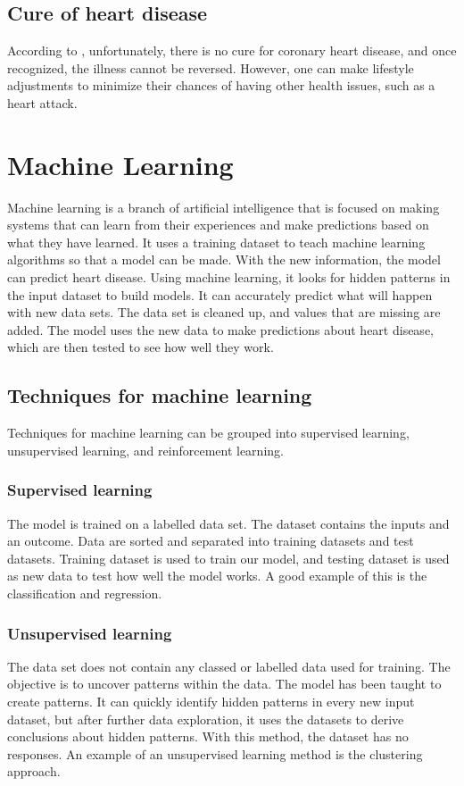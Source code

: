 \subsection{Cure of heart disease}
According to , unfortunately, there is no cure for coronary heart disease, and once recognized, the illness cannot be reversed. However, one can make lifestyle adjustments to minimize their chances of having other health issues, such as a heart attack.

\section{Machine Learning}
Machine learning is a branch of artificial intelligence that is focused on making systems that can learn from their experiences and make predictions based on what they have learned. It uses a training dataset to teach machine learning algorithms so that a model can be made. With the new information, the model can predict heart disease. Using machine learning, it looks for hidden patterns in the input dataset to build models. It can accurately predict what will happen with new data sets. The data set is cleaned up, and values that are missing are added. The model uses the new data to make predictions about heart disease, which are then tested to see how well they work. 

\subsection{Techniques for machine learning}
Techniques for machine learning can be grouped into supervised learning, unsupervised learning, and reinforcement learning.

\subsubsection{Supervised learning}
The model is trained on a labelled data set. The dataset contains the inputs and an outcome. Data are sorted and separated into training datasets and test datasets. Training dataset is used to train our model, and testing dataset is used as new data to test how well the model works. 
A good example of this is the classification and regression.
\subsubsection{Unsupervised learning}
The data set does not contain any classed or labelled data used for training. The objective is to uncover patterns within the data. The model has been taught to create patterns. It can quickly identify hidden patterns in every new input dataset, but after further data exploration, it uses the datasets to derive conclusions about hidden patterns.
With this method, the dataset has no responses. An example of an unsupervised learning method is the clustering approach.
